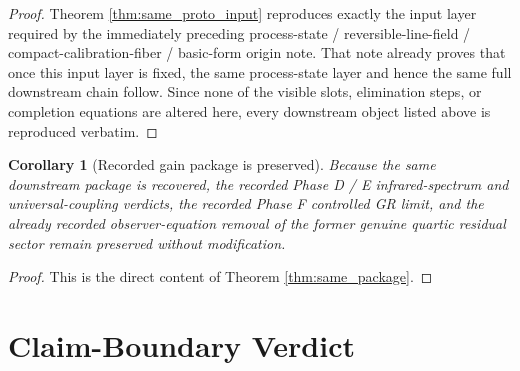 \documentclass[11pt]{article}
\newtheorem{corollary}{Corollary}
\begin{document}
\begin{proof}
Theorem \ref{thm:same_proto_input} reproduces exactly the input layer required by the immediately preceding process-state / reversible-line-field / compact-calibration-fiber / basic-form origin note. That note already proves that once this input layer is fixed, the same process-state layer and hence the same full downstream chain follow. Since none of the visible slots, elimination steps, or completion equations are altered here, every downstream object listed above is reproduced verbatim.
\end{proof}

\begin{corollary}[Recorded gain package is preserved]
\label{cor:gains}
Because the same downstream package is recovered, the recorded Phase D / E infrared-spectrum and universal-coupling verdicts, the recorded Phase F controlled GR limit, and the already recorded observer-equation removal of the former genuine quartic residual sector remain preserved without modification.
\end{corollary}

\begin{proof}
This is the direct content of Theorem \ref{thm:same_package}.
\end{proof}

\section{Claim-Boundary Verdict}
\end{document}
